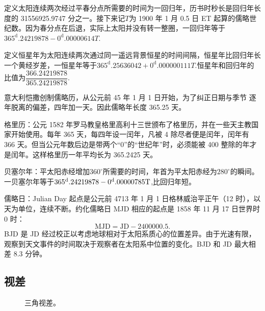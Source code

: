 \documentclass[11pt, a4paper, oneside]{ctexart}
\numberwithin{equation}{subsection}
\begin{document}
定义太阳连续两次经过平春分点所需要的时间为一回归年，历书时秒长是回归年长度的 31556925.9747 分之一。接下来记$T$为 1900 年 1 月 0.5 日 ET 起算的儒略世纪数。因为春分点在后退，实际上太阳并没有转一整圈，一回归年等于$365^\mathrm{d}.24219878-0^\mathrm{d}.00000614T$.

定义恒星年为太阳连续两次通过同一遥远背景恒星的时间间隔，恒星年比回归年长一个黄经岁差，一恒星年等于$365^\mathrm{d}.25636042+0^\mathrm{d}.000000111T$.恒星年和回归年的比值为$\dfrac{366.24219878}{365.24219878}$.

意大利恺撒创制儒略历，从公元前 45 年 1 月 1 日开始，为了纠正日期与季节
逐年脱离的偏差，四年加一天。因此儒略年长度 365.25 天。

格里历：公元 1582 年罗马教皇格里高利十三世颁布了格里历，并在一些天主教国家开始使用。每年 365 天，每四年设一闰年，凡被 4 除尽者便是闰年，闰年有 366 天。但当公元年数后边是带两个“0”的“世纪年”时，必须能被 400 整除的年才是闰年。这样格里历一年平均长为 365.2425 天。

贝塞尔年：平太阳赤经增加$360^\circ$所需要的时间，年首为平太阳赤经为$280^\circ$的瞬间。一贝塞尔年等于$\rm 365^\mathrm{d}.24219878-0^\mathrm{d}.00000785T$,比回归年短。

儒略日：Julian Day 起点是公元前 4713 年 1 月 1 日格林威治平正午（12 时），以天为单位，连续不断。约化儒略日 MJD 相应的起点是 1858 年 11 月 17 日世界时 0 时：
\begin{equation}
\text{MJD}=\text{JD}-2400000.5.
\end{equation}
BJD 是 JD 经过校正以考虑地球相对于太阳系质心的位置差异。由于光速有限，观察到天文事件的时间取决于观察者在太阳系中位置的变化。BJD 和 JD 最大相差 8.3 分钟。

\subsection{视差}
\begin{figure}[!htp]
\centering
{}
\captionsetup{justification=raggedright, singlelinecheck=false}
\caption{三角视差。}
\label{三角视差。}
\end{figure}
\end{document}
